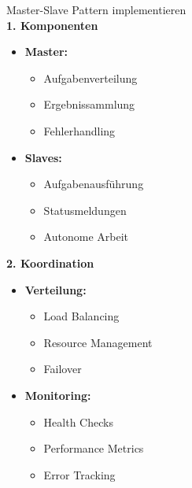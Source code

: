 \begin{KR}{Master-Slave Pattern implementieren}\\
\textbf{1. Komponenten}
\begin{itemize}
    \item \textbf{Master:}
    \begin{itemize}
        \item Aufgabenverteilung
        \item Ergebnissammlung
        \item Fehlerhandling
    \end{itemize}
    
    \item \textbf{Slaves:}
    \begin{itemize}
        \item Aufgabenausführung
        \item Statusmeldungen
        \item Autonome Arbeit
    \end{itemize}
\end{itemize}

\textbf{2. Koordination}
\begin{itemize}
    \item \textbf{Verteilung:}
    \begin{itemize}
        \item Load Balancing
        \item Resource Management
        \item Failover
    \end{itemize}
    
    \item \textbf{Monitoring:}
    \begin{itemize}
        \item Health Checks
        \item Performance Metrics
        \item Error Tracking
    \end{itemize}
\end{itemize}
\end{KR}

